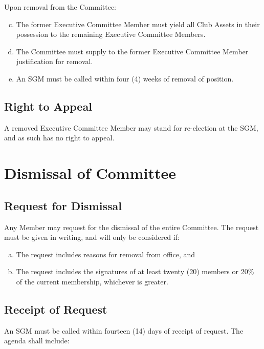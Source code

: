 \documentclass[a4paper,12pt]{article}
\begin{document}
Upon removal from the Committee:

\begin{enumerate}[a)]
	\setcounter{enumi}{2}
	\item The former Executive Committee Member must yield all Club Assets in their possession to the remaining Executive Committee Members.
	\item The Committee must supply to the former Executive Committee Member justification for removal.
	\item An SGM must be called within four (4) weeks of removal of position.
\end{enumerate}

\subsection{Right to Appeal}

A removed Executive Committee Member may stand for re-election at the SGM, and as such has no right to appeal.

\section{Dismissal of Committee}

\subsection{Request for Dismissal}

Any Member may request for the dismissal of the entire Committee. The request must be given in writing, and will only be considered if:

\begin{enumerate}[a)]
	\item The request includes reasons for removal from office, and
	\item The request includes the signatures of at least twenty (20) members or 20\% of the current membership, whichever is greater.
\end{enumerate}

\subsection{Receipt of Request}

An SGM must be called within fourteen (14) days of receipt of request. The agenda shall include:
\end{document}
